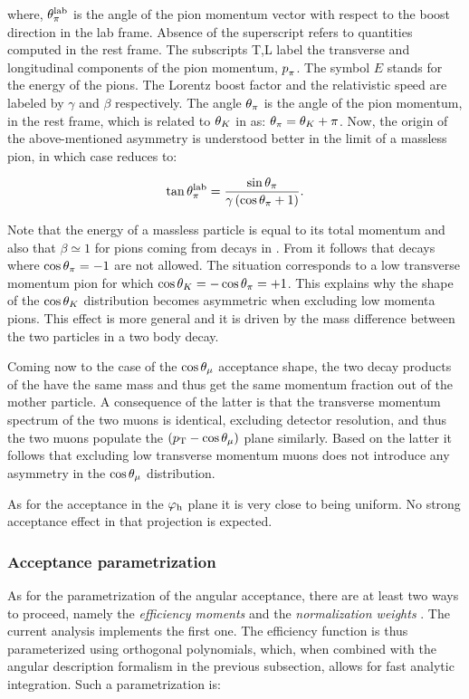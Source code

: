 \noindent where, $\theta_{\pi}^{\rm lab}$ is the angle of the pion momentum vector with respect to the boost direction
in the lab frame. Absence of the \lab superscript refers to quantities computed in the \Kstarz rest frame.
The subscripts T,L label the transverse and longitudinal components of the pion momentum, $\mbox{$p$}_{\pi}$.
The symbol $E$ stands for the energy of the pions. The Lorentz boost factor and the relativistic speed
are labeled by $\gamma$ and $\beta$ respectively. The angle $\theta_{\pi}$ is the angle of the pion momentum,
in the \Kstarz rest frame, which is related to $\theta_{K}$ in  as: $\theta_{\pi} = \theta_{K} + \pi$.
Now, the origin of the above-mentioned asymmetry is understood better in the limit of a massless pion,
in which case  reduces to:

\begin{equation}
  \centering
  \tan\thetapi^\lab = \frac{\sin\thetapi}{\gamma\parenthesis{\cos\thetapi + 1} }.
  \label{pi_angle_massless}
\end{equation}

\noindent Note that the energy of a massless particle is equal to its total momentum and also that $\beta \simeq 1$
for pions coming from \BJpsiKpi decays in \lhcb. From  it follows that decays where $\cos\theta_{\pi}=-1$
are not allowed. The situation corresponds to a low transverse momentum pion for which $\cos\theta_{K} = -\cos\theta_{\pi} = +1$.
This explains why the shape of the $\cos\theta_{K}$ distribution becomes asymmetric when excluding low momenta pions.
This effect is more general and it is driven by the mass difference between the two particles in a two body decay.

Coming now to the case of the $\cos\theta_{\mu}$ acceptance shape, the two decay products of the \jpsi have
the same mass and thus get the same momentum fraction out of the mother \jpsi particle. A consequence of
the latter is that the transverse momentum spectrum of the two muons is identical, excluding detector
resolution, and thus the two muons populate the $(\mbox{$p_{\rm T}$}-\cos\theta_{\mu})$ plane similarly. Based on the latter
it follows that excluding low transverse momentum muons does not introduce any asymmetry in the $\cos\theta_{\mu}$ distribution.

As for the acceptance in the $\varphi_{\rm h}$ plane it is very close to being uniform.
No strong acceptance effect in that projection is expected.

\subsubsection{Acceptance parametrization}
\label{Acceptance parametrization}
As for the parametrization of the angular acceptance, there are at least two ways to proceed,
namely the \emph{efficiency moments} \cite{jeroenThesis} and the \emph{normalization weights} \cite{tristanThesis,jeroenThesis}.
The current analysis implements the first one. The efficiency function is thus parameterized using orthogonal polynomials,
which, when combined with the angular description formalism in the previous subsection, allows for fast analytic
integration. Such a parametrization is:

